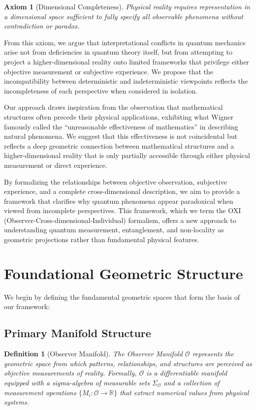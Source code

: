 \documentclass{article}
\newtheorem{definition}{Definition}
\newtheorem{axiom}{Axiom}
\begin{document}
\begin{axiom}[Dimensional Completeness]
Physical reality requires representation in a dimensional space sufficient to fully specify all observable phenomena without contradiction or paradox.
\end{axiom}

From this axiom, we argue that interpretational conflicts in quantum mechanics arise not from deficiencies in quantum theory itself, but from attempting to project a higher-dimensional reality onto limited frameworks that privilege either objective measurement or subjective experience. We propose that the incompatibility between deterministic and indeterministic viewpoints reflects the incompleteness of each perspective when considered in isolation.

Our approach draws inspiration from the observation that mathematical structures often precede their physical applications, exhibiting what Wigner famously called the ``unreasonable effectiveness of mathematics'' in describing natural phenomena. We suggest that this effectiveness is not coincidental but reflects a deep geometric connection between mathematical structures and a higher-dimensional reality that is only partially accessible through either physical measurement or direct experience.

By formalizing the relationships between objective observation, subjective experience, and a complete cross-dimensional description, we aim to provide a framework that clarifies why quantum phenomena appear paradoxical when viewed from incomplete perspectives. This framework, which we term the OXI (Observer-Cross-dimensional-Individual) formalism, offers a new approach to understanding quantum measurement, entanglement, and non-locality as geometric projections rather than fundamental physical features.

\section{Foundational Geometric Structure}

We begin by defining the fundamental geometric spaces that form the basis of our framework:

\subsection{Primary Manifold Structure}

\begin{definition}[Observer Manifold]
The Observer Manifold $\mathcal{O}$ represents the geometric space from which patterns, relationships, and structures are perceived as objective measurements of reality. Formally, $\mathcal{O}$ is a differentiable manifold equipped with a sigma-algebra of measurable sets $\Sigma_\mathcal{O}$ and a collection of measurement operations $\{M_i: \mathcal{O} \rightarrow \mathbb{R}\}$ that extract numerical values from physical systems.
\end{definition}
\end{document}
